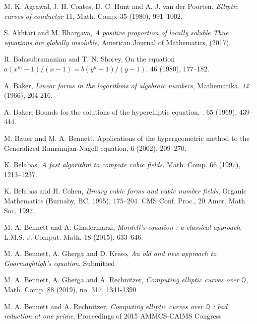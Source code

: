 

\begin{thebibliography}{}

M. K. Agrawal, J. H. Coates, D. C. Hunt and A. J. van der Poorten,
\emph{Elliptic curves of conductor $11$},
Math. Comp. 35 (1980), 991--1002.

S. Akhtari and M. Bhargava,
\emph{A positive proportion of locally soluble Thue equations are globally insoluble}, 
American Journal of Mathematics, (2017).

R. Balasubramanian and T. N. Shorey,
\newblock On the equation $a(x^m-1)/(x-1) = b (y^n-1)/(y-1)$,
  46 (1980), 177--182.

A. Baker, 
\emph{Linear forms in the logarithms of algebraic numbers}, 
Mathematika. \textit{12} (1966), 204-216.

A. Baker,
\newblock Bounds for the solutions of the hyperelliptic equation, 
. 65 (1969), 439--444. 

M. Bauer and M. A. Bennett,
\newblock Applications of the hypergeometric method to the Generalized Ramanujan-Nagell equation,
 6 (2002), 209--270.

K. Belabas,
\emph{A fast algorithm to compute cubic fields,} Math. Comp. 66 (1997), 1213--1237.

K. Belabas and H. Cohen,
\emph{Binary cubic forms and cubic number fields},
Organic Mathematics (Burnaby, BC, 1995), 175--204. CMS Conf. Proc., 20 Amer. Math. Soc. 1997.

M. A. Bennett and A. Ghadermarzi,
\emph{Mordell's equation : a classical approach},
L.M.S. J. Comput. Math. 18 (2015), 633--646.

M. A. Bennett, A. Gherga and D. Kreso, 
\emph{An old and new approach to Goormaghtigh's equation},
Submitted

M. A. Bennett, A. Gherga and A. Rechnitzer,
\emph{Computing elliptic curves over $\mathbb{Q}$},
Math. Comp. 88 (2019), no. 317, 1341-1390

M. A. Bennett and A. Rechnitzer,
\emph{Computing elliptic curves over $\mathbb{Q}$ : bad reduction at one prime}, 
Proceedings of 2015 AMMCS-CAIMS Congress


\end{thebibliography}
